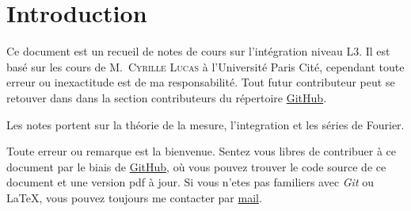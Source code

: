 \section{Introduction}

Ce document est un recueil de notes de cours sur l'intégration niveau L3. Il est
basé sur les cours de M.~\textsc{Cyrille Lucas} à l'Université Paris Cité, cependant toute
erreur ou inexactitude est de ma responsabilité. Tout futur contributeur
peut se retouver dans dans la section contributeurs du répertoire
\href{https://github.com/Yag000/integration-notes/graphs/contributors}{GitHub}.
\vspace{0.5cm}

Les notes portent sur la théorie de la mesure, l'integration et les séries de Fourier.
\vspace{0.5cm}

Toute erreur ou remarque est la bienvenue.
Sentez vous libres de contribuer à ce document par le biais de \href{https://github.com/Yag000/integration-notes}{GitHub},
où vous pouvez trouver le code source de ce document et une version pdf à jour.
Si vous n'etes pas familiers avec \textit{Git} ou \LaTeX , vous pouvez toujours me contacter
par \href{mailto: yago.iglesias.vazquez@gmail.com}{mail}.



